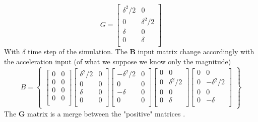 \documentclass{article}
\begin{document}
\begin{multicols}{2}
\[        G=\begin{bmatrix}
            \delta^2/2 & 0          \\
            0          & \delta^2/2 \\
            \delta     & 0          \\
            0          & \delta     \\
        \end{bmatrix}
    \]
    With $\delta$ time step of the simulation.
    The \textbf{B} input matrix change accordingly with the acceleration input (of what we suppose we know only the magnitude)
    \[
        B=\begin{Bmatrix}
            \begin{bmatrix}
                0 & 0 \\
                0          & 0 \\
                0     & 0 \\
                0          & 0 \\
            \end{bmatrix}
            \begin{bmatrix}
                \delta^2/2 & 0 \\
                0          & 0 \\
                \delta     & 0 \\
                0          & 0 \\
            \end{bmatrix}
            \begin{bmatrix}
                -\delta^2/2 & 0 \\
                0          & 0 \\
                -\delta     & 0 \\
                0          & 0 \\
            \end{bmatrix}
            \begin{bmatrix}
                0 & 0          \\
                0 & \delta^2/2 \\
                0 & 0          \\
                0 & \delta     \\
            \end{bmatrix}
            \begin{bmatrix}
                0 & 0          \\
                0 & -\delta^2/2 \\
                0 & 0          \\
                0 & -\delta     \\
            \end{bmatrix}
        \end{Bmatrix}
    \]
    The \textbf{G} matrix is a merge between the "positive" matrices .


\end{multicols}
\end{document}
